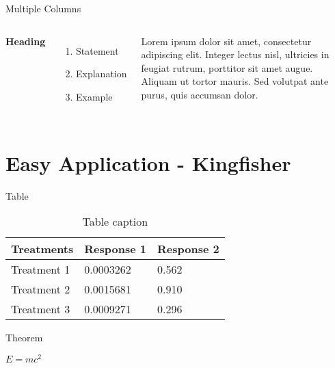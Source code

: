 \documentclass[aspectratio=169,xcolor=dvipsnames]{beamer}
\begin{document}
	
	\begin{frame}{Multiple Columns}
		\begin{columns}[c] %
			
			\textbf{Heading}
			\begin{enumerate}
				\item Statement
				\item Explanation
				\item Example
			\end{enumerate}
			
			Lorem ipsum dolor sit amet, consectetur adipiscing elit. Integer lectus nisl, ultricies in feugiat rutrum, porttitor sit amet augue. Aliquam ut tortor mauris. Sed volutpat ante purus, quis accumsan dolor.
			
		\end{columns}
	\end{frame}
	
	\section{Easy Application - Kingfisher}
	
	\begin{frame}{Table}
		\begin{table}
			\begin{tabular}{l l l}
				\toprule
				\textbf{Treatments} & \textbf{Response 1} & \textbf{Response 2} \\
				\midrule
				Treatment 1         & 0.0003262           & 0.562               \\
				Treatment 2         & 0.0015681           & 0.910               \\
				Treatment 3         & 0.0009271           & 0.296               \\
				\bottomrule
			\end{tabular}
			\caption{Table caption}
		\end{table}
	\end{frame}
	
	
	\begin{frame}{Theorem}
		\begin{theorem}
			$E = mc^2$
		\end{theorem}
	\end{frame}
	
\end{document}
